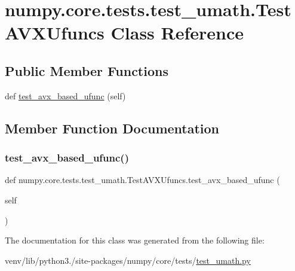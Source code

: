 \hypertarget{classnumpy_1_1core_1_1tests_1_1test__umath_1_1TestAVXUfuncs}{}\section{numpy.\+core.\+tests.\+test\+\_\+umath.\+Test\+A\+V\+X\+Ufuncs Class Reference}
\label{classnumpy_1_1core_1_1tests_1_1test__umath_1_1TestAVXUfuncs}
\subsection*{Public Member Functions}
\begin{DoxyCompactItemize}
\item 
def \hyperlink{classnumpy_1_1core_1_1tests_1_1test__umath_1_1TestAVXUfuncs_a6a1904fb664b1ce278f82f87623d3823}{test\+\_\+avx\+\_\+based\+\_\+ufunc} (self)
\end{DoxyCompactItemize}


\subsection{Member Function Documentation}
\mbox{\label{classnumpy_1_1core_1_1tests_1_1test__umath_1_1TestAVXUfuncs_a6a1904fb664b1ce278f82f87623d3823}} 
\subsubsection{\texorpdfstring{test\+\_\+avx\+\_\+based\+\_\+ufunc()}{test\_avx\_based\_ufunc()}}
{\footnotesize\ttfamily def numpy.\+core.\+tests.\+test\+\_\+umath.\+Test\+A\+V\+X\+Ufuncs.\+test\+\_\+avx\+\_\+based\+\_\+ufunc (\begin{DoxyParamCaption}\item[{}]{self }\end{DoxyParamCaption})}



The documentation for this class was generated from the following file\+:\begin{DoxyCompactItemize}
\item 
venv/lib/python3./site-\/packages/numpy/core/tests/\hyperlink{test__umath_8py}{test\+\_\+umath.\+py}\end{DoxyCompactItemize}
